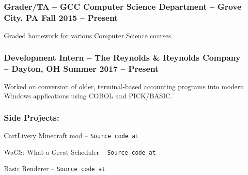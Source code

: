 \documentclass[12pt]{article}
\begin{document}
\subsubsection*{\textnormal{{\color{accent} Grader/TA }\color{head} -- GCC Computer Science Department -- Grove City, PA	\hfill Fall 2015 -- Present}}
\vspace{-2mm}
\begin{compactitem}
	\item Graded homework for various Computer Science courses.
\end{compactitem}
\vspace{-4.5mm}
\subsubsection*{\textnormal{{\color{accent} Development Intern }\color{head} -- The Reynolds \& Reynolds Company -- Dayton, OH	\hfill Summer 2017 -- Present}}
\vspace{-2mm}
\begin{compactitem}
	\item Worked on conversion of older, terminal-based accounting programs into modern Windows applications using COBOL and PICK/BASIC.
\end{compactitem}

\subsubsection*{\color{head}Side Projects:}
\begin{compactitem}
	\item {\color{accent} CartLivery Minecraft mod} -- \texttt{Source code at \underline{}}
	\item {\color{accent} WaGS: What a Great Scheduler} -- \texttt{Source code at \underline{}}
	\item {\color{accent} Basic Renderer} -- \texttt{Source code at \underline{}}
\end{compactitem}
\end{document}
